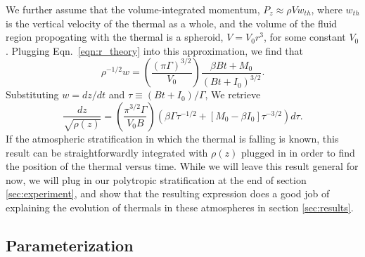 \documentclass[twocolumn, amsmath, amsfonts, amssymb, trackchanges]{aastex62}
\begin{document}
We further assume that the volume-integrated momentum, $P_z \approx \rho V w_{th}$,
where $w_{th}$ is the vertical velocity of the thermal as a whole, and the volume
of the fluid region propogating with the thermal is a spheroid, $V = V_0 r^3$, for
some constant $V_0$. Plugging Eqn.~\ref{eqn:r_theory} into this approximation, we
find that
\begin{equation}
\rho^{-1/2}w = \left(\frac{(\pi\Gamma)^{3/2}}{V_0}\right)\frac{\beta B t + M_0}{(B t + I_0)^{3/2}}.
\end{equation}
Substituting $w = dz/dt$ and $\tau \equiv (Bt + I_0)/\Gamma$, We retrieve
\begin{equation}
\frac{dz}{\sqrt{\rho(z)}} 
= \left(\frac{\pi^{3/2}\Gamma}{V_0 B}\right)
\left(\beta\Gamma\tau^{-1/2} + [M_0 - \beta I_0]\tau^{-3/2}\right)d\tau.
\label{eqn:general_theory}
\end{equation}
If the atmospheric stratification in which the thermal is falling is known, this
result can be straightforwardly integrated with $\rho(z)$ plugged in in order to
find the position of the thermal versus time. While we will leave this result
general for now, we will plug in our polytropic stratification at the end of
section \ref{sec:experiment}, and show that the resulting expression does a
good job of explaining the evolution of thermals in these atmospheres in
section \ref{sec:results}.

\subsection{Parameterization}
\end{document}
